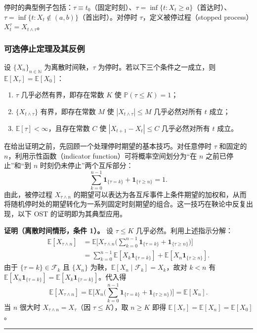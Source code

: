 停时的典型例子包括：$\tau \equiv t_0$（固定时刻）、$\tau = \inf\{t: X_t \geqslant a\}$（首达时）、$\tau = \inf\{t: X_t \notin (a, b)\}$（首出时）。对停时 $\tau$，定义被停过程（stopped process）$X_t^\tau = X_{t \wedge \tau}$。

\subsubsection{可选停止定理及其反例}

\begin{theorem}\label{thm:ost}
设 $\{X_n\}_{n \in \mathbb{N}}$ 为离散时间鞅，$\tau$ 为停时。若以下三个条件之一成立，则 $\mathbb{E}[X_\tau] = \mathbb{E}[X_0]$：
\begin{enumerate}[noitemsep]
  \item $\tau$ 几乎必然有界，即存在常数 $K$ 使 $\mathbb{P}(\tau \leqslant K) = 1$；
  \item $\{X_{t \wedge \tau}\}$ 有界，即存在常数 $M$ 使 $|X_{t \wedge \tau}| \leqslant M$ 几乎必然对所有 $t$ 成立；
  \item $\mathbb{E}[\tau] < \infty$，且存在常数 $C$ 使 $|X_{t+1} - X_t| \leqslant C$ 几乎必然对所有 $t$ 成立。
\end{enumerate}
\end{theorem}

在给出证明之前，先回顾一个处理停时期望的基本技巧。对任意停时 $\tau$ 和固定的 $n$，利用示性函数（indicator function）可将概率空间划分为``在 $n$ 之前已停止''和``到 $n$ 时刻仍未停止''两个互斥部分：
\begin{equation}
  \sum_{k=0}^{n-1} \mathbf{1}_{\{\tau = k\}} + \mathbf{1}_{\{\tau \geqslant n\}} = 1.
\end{equation}
由此，被停过程 $X_{\tau \wedge n}$ 的期望可以表达为各互斥事件上条件期望的加权和，从而将随机停时处的期望转化为一系列固定时刻期望的组合。这一技巧在鞅论中反复出现，以下 OST 的证明即为其典型应用。

\textbf{证明（离散时间情形，条件 1）。} 设 $\tau \leqslant K$ 几乎必然。利用上述指示分解：
\begin{align}
  \mathbb{E}[X_{\tau \wedge n}]
  &= \mathbb{E}\Bigg[X_{\tau \wedge n} \Bigg(\sum_{k=0}^{n-1} \mathbf{1}_{\{\tau = k\}} + \mathbf{1}_{\{\tau \geqslant n\}}\Bigg)\Bigg] \\
  &= \sum_{k=0}^{n-1} \mathbb{E}[X_k \mathbf{1}_{\{\tau = k\}}] + \mathbb{E}[X_n \mathbf{1}_{\{\tau \geqslant n\}}].
\end{align}
由于 $\{\tau = k\} \in \mathcal{F}_k$ 且 $\{X_n\}$ 为鞅，$\mathbb{E}[X_n \mid \mathcal{F}_k] = X_k$，故对 $k < n$ 有 $\mathbb{E}[X_n \mathbf{1}_{\{\tau = k\}}] = \mathbb{E}[X_k \mathbf{1}_{\{\tau = k\}}]$。代入得
\begin{equation}
  \mathbb{E}[X_{\tau \wedge n}]
  = \mathbb{E}\Bigg[X_n\Bigg(\sum_{k=0}^{n-1}\mathbf{1}_{\{\tau = k\}} + \mathbf{1}_{\{\tau \geqslant n\}}\Bigg)\Bigg]
  = \mathbb{E}[X_n].
\end{equation}
当 $n$ 很大时 $X_{\tau \wedge n} = X_\tau$（因 $\tau \leqslant K$），取 $n \geqslant K$ 即得 $\mathbb{E}[X_\tau] = \mathbb{E}[X_n] = \mathbb{E}[X_0]$。\hfill\rule{0.9ex}{0.9ex}

